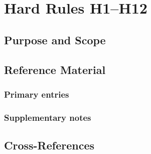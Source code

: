 \chapter{Hard Rules H1--H12}
\label{app:hard_rules}


\section{Purpose and Scope}
\label{sec:app_hard_rules:purpose}

\section{Reference Material}
\label{sec:app_hard_rules:reference}

\subsection{Primary entries}
\label{ssec:app_hard_rules:primary}

\subsection{Supplementary notes}
\label{ssec:app_hard_rules:supplementary}

\section{Cross-References}
\label{sec:app_hard_rules:xref}
